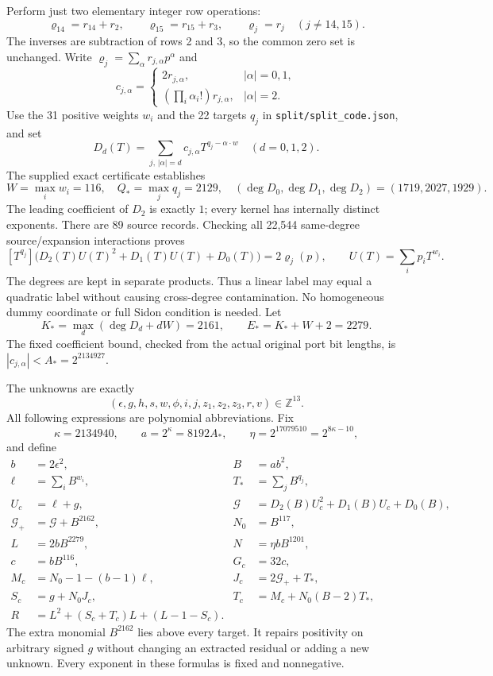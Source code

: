 Perform just two elementary integer row operations:
\[
 \varrho_{14}=r_{14}+r_2,\qquad
 \varrho_{15}=r_{15}+r_3,\qquad \varrho_j=r_j\quad(j\ne14,15).
\]
The inverses are subtraction of rows 2 and 3, so the common zero set is
unchanged. Write $\varrho_j=\sum_\alpha r_{j,\alpha}p^\alpha$ and
\[
 c_{j,\alpha}=\begin{cases}
 2r_{j,\alpha},&|\alpha|=0,1,\\
 (\prod_i\alpha_i!)r_{j,\alpha},&|\alpha|=2.
 \end{cases}
\]
Use the 31 positive weights $w_i$ and the 22 targets $q_j$ in
\texttt{split/split\_code.json}, and set
\[
 D_d(T)=\sum_{j,\,|\alpha|=d}c_{j,\alpha}T^{q_j-\alpha\cdot w}
 \quad(d=0,1,2).
\]
The supplied exact certificate establishes
\[
 W=\max_iw_i=116,\quad Q_*=\max_jq_j=2129,\quad
 (\deg D_0,\deg D_1,\deg D_2)=(1719,2027,1929).
\]
The leading coefficient of $D_2$ is exactly $1$; every kernel has internally
distinct exponents. There are 89 source records. Checking all 22,544
same-degree source/expansion interactions proves
\[
 [T^{q_j}]\bigl(D_2(T)U(T)^2+D_1(T)U(T)+D_0(T)\bigr)
 =2\varrho_j(p),\qquad U(T)=\sum_i p_iT^{w_i}.
\]
The degrees are kept in separate products. Thus a linear label may equal a
quadratic label without causing cross-degree contamination. No homogeneous
dummy coordinate or full Sidon condition is needed. Let
\[
 K_*=\max_d(\deg D_d+dW)=2161,\qquad E_*=K_*+W+2=2279.
\]
The fixed coefficient bound, checked from the actual original port bit
lengths, is $|c_{j,\alpha}|<A_*=2^{2134927}$.

The unknowns are exactly
\[
 (\epsilon,g,h,s,w,\phi,i,j,z_1,z_2,z_3,r,v)\in\mathbb Z^{13}.
\]
All following expressions are polynomial abbreviations. Fix
\[
 \kappa=2134940,\qquad a=2^\kappa=8192A_*,\qquad
 \eta=2^{17079510}=2^{8\kappa-10},
\]
and define
\begin{align*}
 b&=2\epsilon^2,& B&=ab^2,\\
 \ell&=\sum_iB^{w_i},& T_*&=\sum_jB^{q_j},\\
 U_c&=\ell+g,&\mathcal G&=D_2(B)U_c^2+D_1(B)U_c+D_0(B),\\
 \mathcal G_+&=\mathcal G+B^{2162},&N_0&=B^{117},\\
 L&=2bB^{2279},&N&=\eta bB^{1201},\\
 c&=bB^{116},&G_c&=32c,\\
 M_c&=N_0-1-(b-1)\ell,&J_c&=2\mathcal G_++T_*,\\
 S_c&=g+N_0J_c,&T_c&=M_c+N_0(B-2)T_*,\\
 R&=L^2+(S_c+T_c)L+(L-1-S_c).
\end{align*}
The extra monomial $B^{2162}$ lies above every target. It repairs positivity
on arbitrary signed $g$ without changing an extracted residual or adding a
new unknown. Every exponent in these formulas is fixed and nonnegative.

